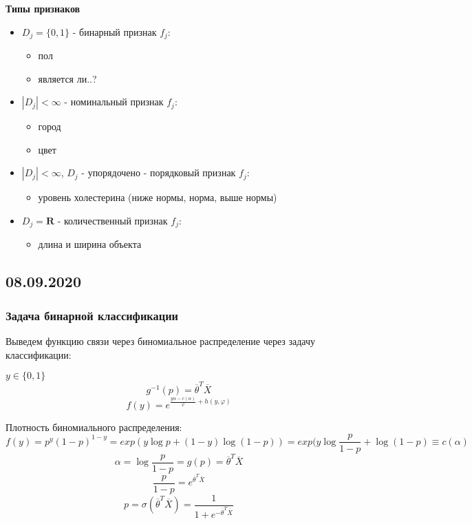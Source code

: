 \documentclass[%
10pt, %
final, %
oneside, %
onecolumn, %
centertags]{article} %
\theoremstyle{plain}
\theoremstyle{definition}
\theoremstyle{remark}
\begin{document}
\textbf{Типы признаков}

\begin{itemize}
	\item $D_j = \{0,1\}$ - бинарный признак $f_j$:
	\begin{itemize}
		\item пол
		\item является ли..?
	\end{itemize}
	\item $|D_j| < \infty$ - номинальный признак $f_j$:
	\begin{itemize}
		\item город
		\item цвет
	\end{itemize}
	\item $|D_j| < \infty$, $D_j$ - упорядочено - порядковый признак $f_j$:
	\begin{itemize}
		\item уровень холестерина (ниже нормы, норма, выше нормы)
	\end{itemize}
	\item $D_j = \textbf{R}$ - количественный признак $f_j$:
	\begin{itemize}
		\item длина и ширина объекта
	\end{itemize}
\end{itemize}


\subsection{08.09.2020}

\subsubsection{Задача бинарной классификации}

Выведем функцию связи через биномиальное распределение через задачу классификации:

$y \in \{0,1\}$ 
$$g^{-1}(p) = \overline{\theta}^T \overline{X}$$
$$f(y) = e^{\frac{y\alpha-c(\alpha)}{\varphi}+h(y,\varphi)}$$

Плотность биномиального распределения:
$$f(y) = p^y(1-p)^{1-y} = exp(y\log p + (1-y)\log(1-p)) = exp(y\log\frac{p}{1-p}+\log(1-p)\equiv c(\alpha)$$
$$\alpha  = \log \frac{p}{1-p} = g(p) = \overline{\theta}^T \overline{X}$$
$$\frac{p}{1-p} = e^{\overline{\theta}^T \overline{X}}$$
$$p = \sigma\left(\overline{\theta}^T \overline{X}\right) = \frac{1}{1+e^{-\overline{\theta}^T \overline{X}}}$$
\end{document}
